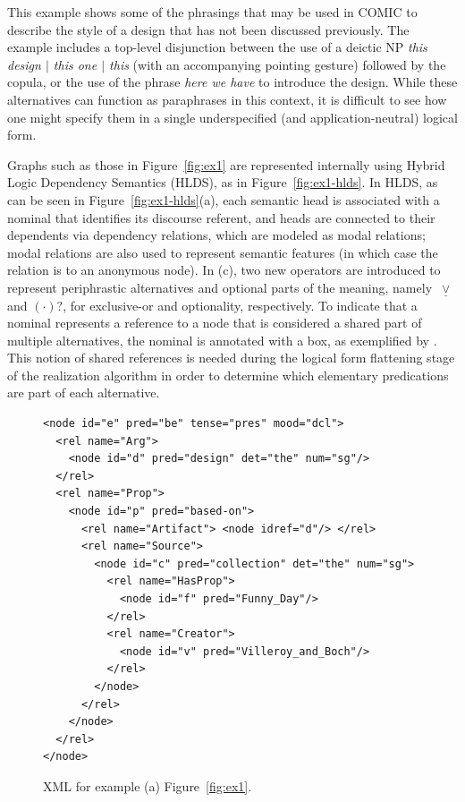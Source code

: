 \documentclass[11pt]{article}
\newcommand{\figref}[1]{Figure~\ref{fig:#1}} %
\newcommand{\xor}{~\underline{\vee}~}
\newcommand{\shared}[1]{\fbox{\ensuremath{#1}}}
\begin{document}
\noindent This example shows some of the phrasings that may be used in
COMIC to describe the style of a design that has not been discussed
previously.  The example includes a top-level disjunction between the
use of a deictic NP \textit{this design $\mid$ this one $\mid$ this}
(with an accompanying pointing gesture) followed by the copula, or the
use of the phrase \textit{here we have} to introduce the design.
While these alternatives can function as paraphrases in this context,
it is difficult to see how one might specify them in a single
underspecified (and application-neutral) logical form.

Graphs such as those in \figref{ex1} are represented internally using
Hybrid Logic Dependency Semantics (HLDS), as in \figref{ex1-hlds}. In
HLDS, as can be seen in \figref{ex1-hlds}(a), each semantic head is
associated with a nominal that identifies its discourse referent, and
heads are connected to their dependents via dependency relations, which
are modeled as modal relations; modal relations are also used to
represent semantic features (in which case the relation is to an
anonymous node). In (c), two new operators are introduced to represent
periphrastic alternatives and optional parts of the meaning, namely
$\xor$ and $(\cdot)?$, for exclusive-or and optionality, respectively.
To indicate that a nominal represents a reference to a node that is
considered a shared part of multiple alternatives, the nominal is
annotated with a box, as exemplified by \shared{v}. This notion of
shared references is needed during the logical form flattening stage of
the realization algorithm in order to determine which elementary
predications are part of each alternative.

\begin{figure}%
\begin{footnotesize}
\begin{verbatim}
<node id="e" pred="be" tense="pres" mood="dcl">
  <rel name="Arg"> 
    <node id="d" pred="design" det="the" num="sg"/>
  </rel>
  <rel name="Prop">
    <node id="p" pred="based-on">
      <rel name="Artifact"> <node idref="d"/> </rel>
      <rel name="Source"> 
        <node id="c" pred="collection" det="the" num="sg">
          <rel name="HasProp"> 
            <node id="f" pred="Funny_Day"/>
          </rel>
          <rel name="Creator"> 
            <node id="v" pred="Villeroy_and_Boch"/>
          </rel> 
        </node>
      </rel>
    </node>
  </rel>
</node>
\end{verbatim}
\end{footnotesize}

\caption{XML for example (a) \figref{ex1}.}
\label{fig:ex1-xml-a}
\end{figure}
\end{document}
